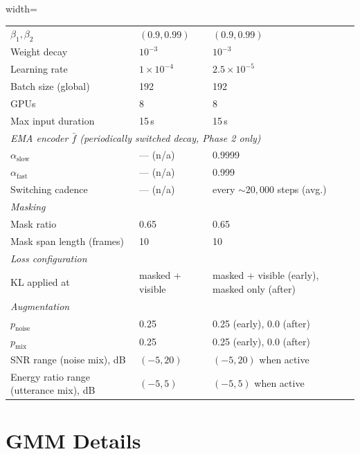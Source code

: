 \documentclass[9pt,twocolumn]{article}
\theoremstyle{plain}
\theoremstyle{definition}
\theoremstyle{remark}
\begin{document}
\begin{table}[h]
\begin{adjustbox}{width=\textwidth}
\begin{tabular}{l@{\hspace{1.5em}}l@{\hspace{1.5em}}l}
$\beta_1, \beta_2$                        & $(0.9, 0.99)$ & $(0.9, 0.99)$ \\
Weight decay                              & $10^{-3}$ & $10^{-3}$ \\
Learning rate                             & $1\!\times\!10^{-4}$ & $2.5\!\times\!10^{-5}$ \\
Batch size (global)                       & 192 & 192 \\
GPUs                                      & 8 & 8 \\
Max input duration                        & 15\,s & 15\,s \\
\midrule
\multicolumn{3}{l}{\emph{EMA encoder $\bar{f}$ (periodically switched decay, Phase 2 only)}} \\
$\alpha_{\text{slow}}$                    & --- (n/a) & 0.9999 \\
$\alpha_{\text{fast}}$                    & --- (n/a) & 0.999 \\
Switching cadence                         & --- (n/a) & every $\sim 20{,}000$ steps (avg.) \\
\midrule
\multicolumn{3}{l}{\emph{Masking}} \\
Mask ratio                                & 0.65 & 0.65 \\
Mask span length (frames)                 & 10   & 10   \\
\midrule
\multicolumn{3}{l}{\emph{Loss configuration}} \\
KL applied at                             & masked + visible & masked + visible (early), masked only (after) \\
\midrule
\multicolumn{3}{l}{\emph{Augmentation}} \\
$p_{\text{noise}}$                        & 0.25 & 0.25 (early), 0.0 (after) \\
$p_{\text{mix}}$                          & 0.25 & 0.25 (early), 0.0 (after) \\
SNR range (noise mix), dB                 & $(-5, 20)$ & $(-5, 20)$ when active \\
Energy ratio range (utterance mix), dB    & $(-5, 5)$  & $(-5, 5)$ when active \\
\bottomrule
\end{tabular}
\end{adjustbox}
\end{table}

\section{GMM Details}
\label{app:gmm}
\end{document}
